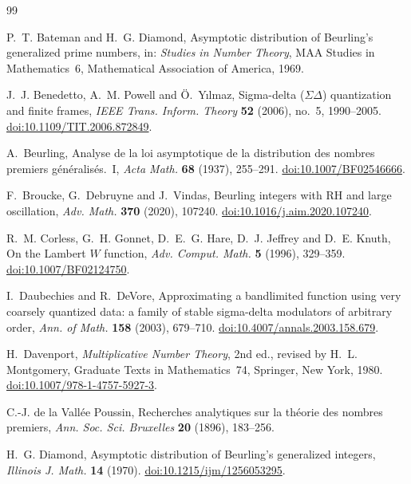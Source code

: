 \documentclass[11pt,reqno]{amsart}
\numberwithin{equation}{section}
\theoremstyle{plain}
\theoremstyle{definition}
\theoremstyle{remark}
\begin{document}
\begin{thebibliography}{99}

P.~T. Bateman and H.~G. Diamond, Asymptotic distribution of Beurling's generalized prime numbers, in: \emph{Studies in Number Theory}, MAA Studies in Mathematics~6, Mathematical Association of America, 1969.

J.~J. Benedetto, A.~M. Powell and \"O.~Y{\i}lmaz, Sigma-delta ($\Sigma\Delta$) quantization and finite frames, \emph{IEEE Trans. Inform. Theory} \textbf{52} (2006), no.~5, 1990--2005.
\href{https://doi.org/10.1109/TIT.2006.872849}{doi:10.1109/TIT.2006.872849}.

A.~Beurling, Analyse de la loi asymptotique de la distribution des nombres premiers g\'en\'eralis\'es.~I, \emph{Acta Math.} \textbf{68} (1937), 255--291.
\href{https://doi.org/10.1007/BF02546666}{doi:10.1007/BF02546666}.

F.~Broucke, G.~Debruyne and J.~Vindas, Beurling integers with RH and large oscillation, \emph{Adv. Math.} \textbf{370} (2020), 107240.
\href{https://doi.org/10.1016/j.aim.2020.107240}{doi:10.1016/j.aim.2020.107240}.

R.~M. Corless, G.~H. Gonnet, D.~E.~G. Hare, D.~J. Jeffrey and D.~E. Knuth, On the Lambert $W$ function, \emph{Adv. Comput. Math.} \textbf{5} (1996), 329--359.
\href{https://doi.org/10.1007/BF02124750}{doi:10.1007/BF02124750}.

I.~Daubechies and R.~DeVore, Approximating a bandlimited function using very coarsely quantized data: a family of stable sigma-delta modulators of arbitrary order, \emph{Ann. of Math.} \textbf{158} (2003), 679--710.
\href{https://doi.org/10.4007/annals.2003.158.679}{doi:10.4007/annals.2003.158.679}.

H.~Davenport, \emph{Multiplicative Number Theory}, 2nd ed., revised by H.~L. Montgomery, Graduate Texts in Mathematics~74, Springer, New York, 1980.
\href{https://doi.org/10.1007/978-1-4757-5927-3}{doi:10.1007/978-1-4757-5927-3}.

C.-J. de la Vall\'ee Poussin, Recherches analytiques sur la th\'eorie des nombres premiers, \emph{Ann. Soc. Sci. Bruxelles} \textbf{20} (1896), 183--256.

H.~G. Diamond, Asymptotic distribution of Beurling's generalized integers, \emph{Illinois J. Math.} \textbf{14} (1970).
\href{https://doi.org/10.1215/ijm/1256053295}{doi:10.1215/ijm/1256053295}.


\end{thebibliography}
\end{document}
